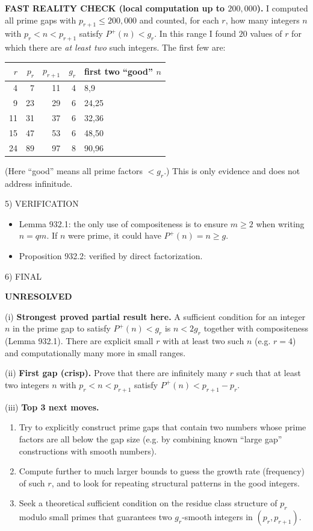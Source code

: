 \medskip
\textbf{FAST REALITY CHECK (local computation up to $200{,}000$).}
I computed all prime gaps with $p_{r+1}\le 200{,}000$ and counted, for each $r$, how many integers $n$ with $p_r<n<p_{r+1}$ satisfy $P^+(n)<g_r$.
In this range I found $20$ values of $r$ for which there are \emph{at least two} such integers.
The first few are:
\begin{center}
\begin{tabular}{r|r|r|r|l}
$r$ & $p_r$ & $p_{r+1}$ & $g_r$ & first two ``good'' $n$\\\hline
4 & 7 & 11 & 4 & 8,9 \\
9 & 23 & 29 & 6 & 24,25 \\
11 & 31 & 37 & 6 & 32,36 \\
15 & 47 & 53 & 6 & 48,50 \\
24 & 89 & 97 & 8 & 90,96 \\
\end{tabular}
\end{center}
(Here ``good'' means all prime factors $<g_r$.)
This is only evidence and does not address infinitude.

5) VERIFICATION

\begin{itemize}
\item Lemma 932.1: the only use of compositeness is to ensure $m\ge 2$ when writing $n=q m$. If $n$ were prime, it could have $P^+(n)=n\ge g$.
\item Proposition 932.2: verified by direct factorization.
\end{itemize}

6) FINAL

\textbf{UNRESOLVED}

(i) \textbf{Strongest proved partial result here.}
A sufficient condition for an integer $n$ in the prime gap to satisfy $P^+(n)<g_r$ is $n<2g_r$ together with compositeness (Lemma 932.1). There are explicit small $r$ with at least two such $n$ (e.g. $r=4$) and computationally many more in small ranges.

(ii) \textbf{First gap (crisp).}
Prove that there are infinitely many $r$ such that at least two integers $n$ with $p_r<n<p_{r+1}$ satisfy $P^+(n)<p_{r+1}-p_r$.

(iii) \textbf{Top 3 next moves.}
\begin{enumerate}
\item Try to explicitly construct prime gaps that contain two numbers whose prime factors are all below the gap size (e.g. by combining known ``large gap'' constructions with smooth numbers).
\item Compute further to much larger bounds to guess the growth rate (frequency) of such $r$, and to look for repeating structural patterns in the good integers.
\item Seek a theoretical sufficient condition on the residue class structure of $p_r$ modulo small primes that guarantees two $g_r$-smooth integers in $(p_r,p_{r+1})$.
\end{enumerate}

